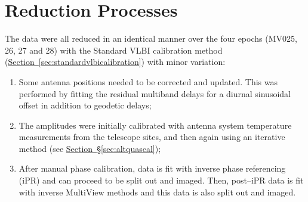 \clearpage
\section{Reduction Processes}	
	The data were all reduced in an identical manner over the four epochs (MV025, 26, 27 and 28) with the Standard VLBI calibration method (\hyperref[sec:standardvlbicalibration]{Section~\ref*{sec:standardvlbicalibration}}) with minor variation:\begin{enumerate}
		\item Some antenna positions needed to be corrected and updated. This was performed by fitting the residual multiband delays for a diurnal sinusoidal offset in addition to geodetic delays;
		\item The amplitudes were initially calibrated with antenna system temperature measurements from the telescope sites, and then again using an iterative method (see \hyperref[sec:altquascal]{Section~\S\ref*{sec:altquascal}});
		\item After manual phase calibration, data is fit with inverse phase referencing (iPR) and can proceed to be split out and imaged. Then, post--iPR  data is fit with inverse MultiView methods and this data is also split out and imaged.
	\end{enumerate}

